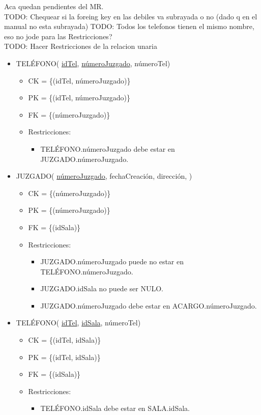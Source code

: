 Aca quedan pendientes del MR.\\

TODO: Chequear si la foreing key en las debiles va subrayada o no (dado q en el manual no esta subrayada)
TODO: Todos los telefonos tienen el mismo nombre, eso no jode para las Restricciones? \\
TODO: Hacer Restricciones de la relacion unaria \\
\begin{itemize}

\item TELÉFONO( \underline{idTel}, \underline{númeroJuzgado}, númeroTel) 
	\begin{itemize}
		\item CK = \{(idTel, númeroJuzgado)\}
		\item PK = \{(idTel, númeroJuzgado)\}
		\item FK = \{(númeroJuzgado)\}
		\item Restricciones:
			\begin{itemize}
			\item  TELÉFONO.númeroJuzgado debe estar en JUZGADO.númeroJuzgado.
			\\
			
			\end{itemize}
	\end{itemize}
	

	
\item JUZGADO( \underline{númeroJuzgado}, fechaCreación, dirección, )
	\begin{itemize}
		\item CK = \{(númeroJuzgado)\}
		\item PK = \{(númeroJuzgado)\}
		\item FK = \{(idSala)\}
		\item Restricciones:
			\begin{itemize}
			\item JUZGADO.númeroJuzgado puede no estar en TELÉFONO.númeroJuzgado.
			\item JUZGADO.idSala no puede ser NULO.
			\item JUZGADO.númeroJuzgado debe estar en ACARGO.númeroJuzgado.
			\\
			\end{itemize}
	\end{itemize}


\item TELÉFONO( \underline{idTel}, \underline{idSala}, númeroTel) 
	\begin{itemize}
		\item CK = \{(idTel, idSala)\}
		\item PK = \{(idTel, idSala)\}
		\item FK = \{(idSala)\}
		\item Restricciones:
			\begin{itemize}
			\item TELÉFONO.idSala debe estar en  SALA.idSala.
			\\
			\end{itemize}
	\end{itemize}



\end{itemize}
